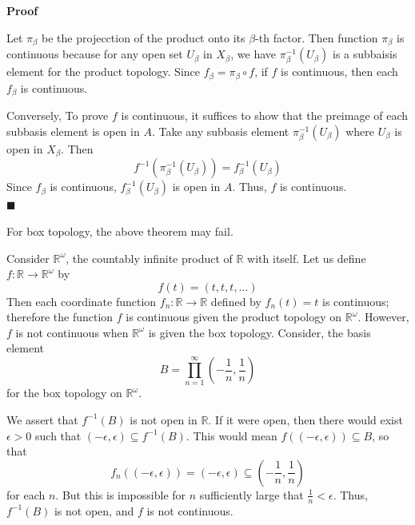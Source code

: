 \documentclass[main.tex]{subfiles}
\begin{document}
\par \noindent \textbf{Proof} 
\par Let $\pi_{\beta}$ be the projecction of the product onto its $\beta$-th factor. Then function $\pi_{\beta} $ is continuous because for any open set $U_{\beta}$ in $X_{\beta}$, we have $\pi_{\beta}^{-1}(U_{\beta})$ is a subbaisis element for the product topology. Since $f_{\beta} = \pi_{\beta} \circ f$, if $f$ is continuous, then each $f_{\beta}$ is continuous. 
\par Conversely, To prove $f$ is continuous, it suffices to show that the preimage of each subbasis element is open in $A$. Take any subbasis element $\pi_{\beta}^{-1}(U_{\beta})$ where $U_{\beta}$ is open in $X_{\beta}$. Then
\begin{equation}
    f^{-1}(\pi_{\beta}^{-1}(U_{\beta})) = f_{\beta}^{-1}(U_{\beta})
\end{equation}
Since $f_{\beta}$ is continuous, $f_{\beta}^{-1}(U_{\beta})$ is open in $A$. Thus, $f$ is continuous.
\mbox{} \\ \null \hfill $\blacksquare$ 

\begin{example}
    For box topology, the above theorem may fail. 
    \par Consider $\mathbb{R}^{\omega}$, the countably infinite product of $\mathbb{R}$ with itself. Let us define $f: \mathbb{R} \rightarrow \mathbb{R}^{\omega}$ by
    \begin{equation}
        f(t) = (t, t, t, \ldots)
    \end{equation}
    Then each coordinate function $f_n: \mathbb{R} \rightarrow \mathbb{R}$ defined by $f_n(t) = t$ is continuous; therefore the function $f$ is continuous given the product topology on $\mathbb{R}^{\omega}$. However, $f$ is not continuous when $\mathbb{R}^{\omega}$ is given the box topology. Consider, the basis element
    \begin{equation}
        B = \prod_{n=1}^{\infty} \left( -\frac{1}{n}, \frac{1}{n} \right) 
    \end{equation}
    for the box topology on $\mathbb{R}^{\omega}$. 
    \par We assert that $f^{-1}(B)$ is not open in $\mathbb{R}$. If it were open, then there would exist $\epsilon > 0$ such that $(-\epsilon, \epsilon) \subseteq f^{-1}(B)$. This would mean $f((-\epsilon, \epsilon)) \subseteq B$, so that 
    \begin{equation}
        f_n((-\epsilon, \epsilon)) = (-\epsilon, \epsilon) \subseteq \left( -\frac{1}{n}, \frac{1}{n} \right)
    \end{equation}
    for each $n$. But this is impossible for $n$ sufficiently large that $\frac{1}{n} < \epsilon$. Thus, $f^{-1}(B)$ is not open, and $f$ is not continuous.
\end{example}
\end{document}
